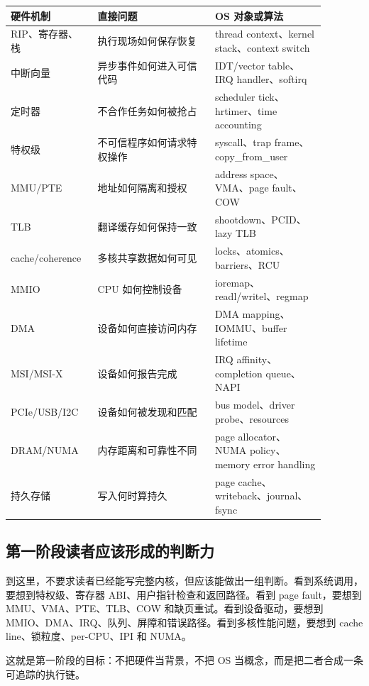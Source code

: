\begin{longtable}{p{0.22\linewidth}p{0.34\linewidth}p{0.32\linewidth}}
\toprule
硬件机制 & 直接问题 & OS 对象或算法 \\
\midrule
RIP、寄存器、栈 & 执行现场如何保存恢复 & thread context、kernel stack、context switch \\
中断向量 & 异步事件如何进入可信代码 & IDT/vector table、IRQ handler、softirq \\
定时器 & 不合作任务如何被抢占 & scheduler tick、hrtimer、time accounting \\
特权级 & 不可信程序如何请求特权操作 & syscall、trap frame、copy\_from\_user \\
MMU/PTE & 地址如何隔离和授权 & address space、VMA、page fault、COW \\
TLB & 翻译缓存如何保持一致 & shootdown、PCID、lazy TLB \\
cache/coherence & 多核共享数据如何可见 & locks、atomics、barriers、RCU \\
MMIO & CPU 如何控制设备 & ioremap、readl/writel、regmap \\
DMA & 设备如何直接访问内存 & DMA mapping、IOMMU、buffer lifetime \\
MSI/MSI-X & 设备如何报告完成 & IRQ affinity、completion queue、NAPI \\
PCIe/USB/I2C & 设备如何被发现和匹配 & bus model、driver probe、resources \\
DRAM/NUMA & 内存距离和可靠性不同 & page allocator、NUMA policy、memory error handling \\
持久存储 & 写入何时算持久 & page cache、writeback、journal、fsync \\
\bottomrule
\end{longtable}

\subsection{第一阶段读者应该形成的判断力}

到这里，不要求读者已经能写完整内核，但应该能做出一组判断。看到系统调用，要想到特权级、寄存器 ABI、用户指针检查和返回路径。看到 page fault，要想到 MMU、VMA、PTE、TLB、COW 和缺页重试。看到设备驱动，要想到 MMIO、DMA、IRQ、队列、屏障和错误路径。看到多核性能问题，要想到 cache line、锁粒度、per-CPU、IPI 和 NUMA。

这就是第一阶段的目标：不把硬件当背景，不把 OS 当概念，而是把二者合成一条可追踪的执行链。

